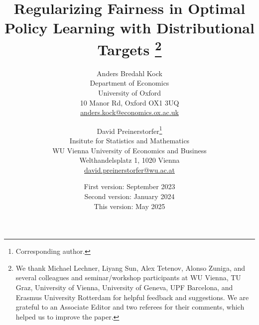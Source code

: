 \documentclass[11pt, a4paper]{article}
\theoremstyle{definition}
\begin{document}
\title{Regularizing Fairness in Optimal Policy Learning with Distributional Targets \footnote{We thank Michael Lechner, Liyang Sun, Alex Tetenov, Alonso Zuniga, and several colleagues and seminar/workshop participants at WU Vienna, TU Graz, University of Vienna, University of Geneva, UPF Barcelona, and Erasmus University Rotterdam for helpful feedback and suggestions. We are grateful to an Associate Editor and two referees for their comments, which helped us to improve the paper.}}


\author{
\begin{tabular}{c}
Anders Bredahl Kock \\ 
\small Department of Economics \\
\small	University of Oxford \\
\small	10 Manor Rd, Oxford OX1 3UQ
\\
\small	{\small	\href{mailto:anders.kock@economics.ox.ac.uk}{anders.kock@economics.ox.ac.uk}} 
\end{tabular}
\and
\begin{tabular}{c}
David Preinerstorfer\footnote{Corresponding author.} \\ 
{\small	Insitute for Statistics and Mathematics} \\ 
{\small	WU Vienna University of Economics and Business} \\
{\small Welthandelsplatz 1, 1020 Vienna } \\ 
{\small	 \href{mailto:david.preinerstorfer@wu.ac.at}{david.preinerstorfer@wu.ac.at}}
\end{tabular}
}

\onehalfspacing
\date{First version: September 2023 \\ Second version: January 2024 \\ This version: May 2025}

\maketitle	
\end{document}

